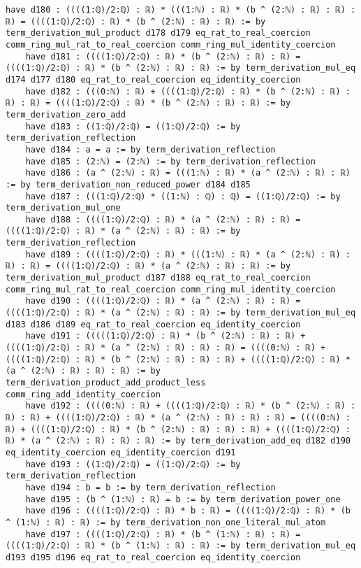 \documentclass{article}
\begin{document}
\begin{tcolorbox}[colback=white!10, width=\linewidth]
\begin{lstlisting}[language=Lean4]
    have d180 : ((((1:ℚ)/2:ℚ) : ℝ) * (((1:ℕ) : ℝ) * (b ^ (2:ℕ) : ℝ) : ℝ) : ℝ) = ((((1:ℚ)/2:ℚ) : ℝ) * (b ^ (2:ℕ) : ℝ) : ℝ) := by term_derivation_mul_product d178 d179 eq_rat_to_real_coercion comm_ring_mul_rat_to_real_coercion comm_ring_mul_identity_coercion
    have d181 : ((((1:ℚ)/2:ℚ) : ℝ) * (b ^ (2:ℕ) : ℝ) : ℝ) = ((((1:ℚ)/2:ℚ) : ℝ) * (b ^ (2:ℕ) : ℝ) : ℝ) := by term_derivation_mul_eq d174 d177 d180 eq_rat_to_real_coercion eq_identity_coercion
    have d182 : (((0:ℕ) : ℝ) + ((((1:ℚ)/2:ℚ) : ℝ) * (b ^ (2:ℕ) : ℝ) : ℝ) : ℝ) = ((((1:ℚ)/2:ℚ) : ℝ) * (b ^ (2:ℕ) : ℝ) : ℝ) := by term_derivation_zero_add
    have d183 : ((1:ℚ)/2:ℚ) = ((1:ℚ)/2:ℚ) := by term_derivation_reflection
    have d184 : a = a := by term_derivation_reflection
    have d185 : (2:ℕ) = (2:ℕ) := by term_derivation_reflection
    have d186 : (a ^ (2:ℕ) : ℝ) = (((1:ℕ) : ℝ) * (a ^ (2:ℕ) : ℝ) : ℝ) := by term_derivation_non_reduced_power d184 d185
    have d187 : (((1:ℚ)/2:ℚ) * ((1:ℕ) : ℚ) : ℚ) = ((1:ℚ)/2:ℚ) := by term_derivation_mul_one
    have d188 : ((((1:ℚ)/2:ℚ) : ℝ) * (a ^ (2:ℕ) : ℝ) : ℝ) = ((((1:ℚ)/2:ℚ) : ℝ) * (a ^ (2:ℕ) : ℝ) : ℝ) := by term_derivation_reflection
    have d189 : ((((1:ℚ)/2:ℚ) : ℝ) * (((1:ℕ) : ℝ) * (a ^ (2:ℕ) : ℝ) : ℝ) : ℝ) = ((((1:ℚ)/2:ℚ) : ℝ) * (a ^ (2:ℕ) : ℝ) : ℝ) := by term_derivation_mul_product d187 d188 eq_rat_to_real_coercion comm_ring_mul_rat_to_real_coercion comm_ring_mul_identity_coercion
    have d190 : ((((1:ℚ)/2:ℚ) : ℝ) * (a ^ (2:ℕ) : ℝ) : ℝ) = ((((1:ℚ)/2:ℚ) : ℝ) * (a ^ (2:ℕ) : ℝ) : ℝ) := by term_derivation_mul_eq d183 d186 d189 eq_rat_to_real_coercion eq_identity_coercion
    have d191 : (((((1:ℚ)/2:ℚ) : ℝ) * (b ^ (2:ℕ) : ℝ) : ℝ) + ((((1:ℚ)/2:ℚ) : ℝ) * (a ^ (2:ℕ) : ℝ) : ℝ) : ℝ) = ((((0:ℕ) : ℝ) + ((((1:ℚ)/2:ℚ) : ℝ) * (b ^ (2:ℕ) : ℝ) : ℝ) : ℝ) + ((((1:ℚ)/2:ℚ) : ℝ) * (a ^ (2:ℕ) : ℝ) : ℝ) : ℝ) := by term_derivation_product_add_product_less comm_ring_add_identity_coercion
    have d192 : ((((0:ℕ) : ℝ) + ((((1:ℚ)/2:ℚ) : ℝ) * (b ^ (2:ℕ) : ℝ) : ℝ) : ℝ) + ((((1:ℚ)/2:ℚ) : ℝ) * (a ^ (2:ℕ) : ℝ) : ℝ) : ℝ) = ((((0:ℕ) : ℝ) + ((((1:ℚ)/2:ℚ) : ℝ) * (b ^ (2:ℕ) : ℝ) : ℝ) : ℝ) + ((((1:ℚ)/2:ℚ) : ℝ) * (a ^ (2:ℕ) : ℝ) : ℝ) : ℝ) := by term_derivation_add_eq d182 d190 eq_identity_coercion eq_identity_coercion d191
    have d193 : ((1:ℚ)/2:ℚ) = ((1:ℚ)/2:ℚ) := by term_derivation_reflection
    have d194 : b = b := by term_derivation_reflection
    have d195 : (b ^ (1:ℕ) : ℝ) = b := by term_derivation_power_one
    have d196 : ((((1:ℚ)/2:ℚ) : ℝ) * b : ℝ) = ((((1:ℚ)/2:ℚ) : ℝ) * (b ^ (1:ℕ) : ℝ) : ℝ) := by term_derivation_non_one_literal_mul_atom
    have d197 : ((((1:ℚ)/2:ℚ) : ℝ) * (b ^ (1:ℕ) : ℝ) : ℝ) = ((((1:ℚ)/2:ℚ) : ℝ) * (b ^ (1:ℕ) : ℝ) : ℝ) := by term_derivation_mul_eq d193 d195 d196 eq_rat_to_real_coercion eq_identity_coercion

\end{lstlisting}
\end{tcolorbox}
\end{document}
